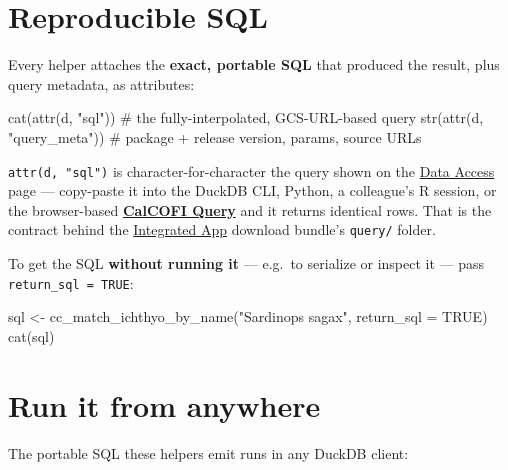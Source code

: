 \documentclass[
  letterpaper,
  DIV=11,
  numbers=noendperiod]{scrreprt}
\newenvironment{Shaded}{\begin{snugshade}}{\end{snugshade}}
\newcommand{\AttributeTok}[1]{\textcolor[rgb]{0.40,0.45,0.13}{#1}}
\newcommand{\CommentTok}[1]{\textcolor[rgb]{0.37,0.37,0.37}{#1}}
\newcommand{\ConstantTok}[1]{\textcolor[rgb]{0.56,0.35,0.01}{#1}}
\newcommand{\FunctionTok}[1]{\textcolor[rgb]{0.28,0.35,0.67}{#1}}
\newcommand{\NormalTok}[1]{\textcolor[rgb]{0.00,0.23,0.31}{#1}}
\newcommand{\OtherTok}[1]{\textcolor[rgb]{0.00,0.23,0.31}{#1}}
\newcommand{\StringTok}[1]{\textcolor[rgb]{0.13,0.47,0.30}{#1}}
\begin{document}
\section{Reproducible SQL}\label{reproducible-sql}

Every helper attaches the \textbf{exact, portable SQL} that produced the
result, plus query metadata, as attributes:

\begin{Shaded}
\begin{Highlighting}[]
\FunctionTok{cat}\NormalTok{(}\FunctionTok{attr}\NormalTok{(d, }\StringTok{"sql"}\NormalTok{))           }\CommentTok{\# the fully{-}interpolated, GCS{-}URL{-}based query}
\FunctionTok{str}\NormalTok{(}\FunctionTok{attr}\NormalTok{(d, }\StringTok{"query\_meta"}\NormalTok{))    }\CommentTok{\# package + release version, params, source URLs}
\end{Highlighting}
\end{Shaded}

\texttt{attr(d,\ "sql")} is character-for-character the query shown on
the \hyperref[sec-worked-example]{Data Access} page --- copy-paste it
into the DuckDB CLI, Python, a colleague's R session, or the
browser-based \textbf{\href{https://calcofi.io/db-query/}{CalCOFI
Query}} and it returns identical rows. That is the contract behind the
\href{https://app.calcofi.io/db-viz-hex}{Integrated App} download
bundle's \texttt{query/} folder.

To get the SQL \textbf{without running it} --- e.g.~to serialize or
inspect it --- pass \texttt{return\_sql\ =\ TRUE}:

\begin{Shaded}
\begin{Highlighting}[]
\NormalTok{sql }\OtherTok{\textless{}{-}} \FunctionTok{cc\_match\_ichthyo\_by\_name}\NormalTok{(}\StringTok{"Sardinops sagax"}\NormalTok{, }\AttributeTok{return\_sql =} \ConstantTok{TRUE}\NormalTok{)}
\FunctionTok{cat}\NormalTok{(sql)}
\end{Highlighting}
\end{Shaded}

\section{Run it from anywhere}\label{run-it-from-anywhere-1}

The portable SQL these helpers emit runs in any DuckDB client:
\end{document}

